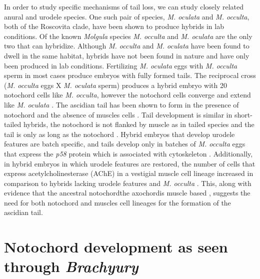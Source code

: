 In order to study specific mechanisms of tail loss, we can study closely related anural and urodele species.  One such pair of species, \textit{M. oculata} and \textit{M. occulta}, both of the Roscovita clade, have been shown to produce hybrids in lab conditions. Of the known \textit{Molgula} species \textit{M. occulta} and \textit{M. oculata} are the only two that can hybridize. Although \textit{M. occulta} and \textit{M. oculata} have been found to dwell in the same habitat, hybrids have not been found in nature and have only been produced in lab conditions. Fertilizing \textit{M. oculata} eggs with \textit{M. occulta} sperm in most cases produce embryos with fully formed tails. The reciprocal cross (\textit{M. occulta} eggs X \textit{M. oculata} sperm) produces a hybrid embryo with 20 notochord cells like \textit{M. occulta}, however the notochord cells converge and extend like \textit{M. oculata} \cite{swalla_interspecific_1990}. The ascidian tail has been shown to form in the presence of notochord and the absence of muscles cells \cite{miyamoto_formation_1985}. Tail development is similar in short-tailed hybrids, the notochord is not flanked by muscle as in tailed species and the tail is only as long as the notochord \cite{swalla_novel_1993}. Hybrid embryos that develop urodele features are batch specific, and tails develop only in batches of \textit{M. occulta} eggs that express the \textit{p58} protein which is associated with cytoskeleton \cite{swalla_identification_1991,jeffery_factors_1992}. Additionally, in hybrid embryos in which urodele features are restored, the number of cells that express acetylcholinesterase (AChE) in a vestigial muscle cell lineage increased in comparison to hybrids lacking urodele features and \textit{M. occulta} \cite{jeffery_evolutionary_1991}. This, along with evidence that the ancestral notochord\textemdash the axochord\textemdash is muscle based \cite{lauri_development_2014}, suggests the need for both notochord and muscles cell lineages for the formation of the ascidian tail. 

\section{Notochord development as seen through \textit{Brachyury}}

